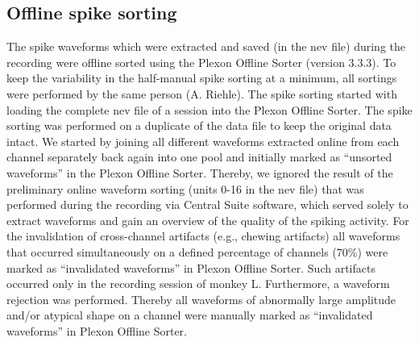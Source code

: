 {\subsection{Offline spike sorting}
\label{sec:offline_spike_sorting}
The spike waveforms which were extracted and saved (in the nev file) during the recording were offline sorted using the Plexon Offline Sorter (version 3.3.3). To keep the variability in the half-manual spike sorting at a minimum, all sortings were performed by the same person (A. Riehle). The spike sorting started with loading the complete nev file of a session into the Plexon Offline Sorter. The spike sorting was performed on a duplicate of the data file to keep the original data intact. We started by joining all different waveforms extracted online from each channel separately back again into one pool and initially marked as “unsorted waveforms” in the Plexon Offline Sorter. Thereby, we ignored the result of the preliminary online waveform sorting (units 0-16 in the nev file) that was performed during the recording via Central Suite software, which served solely to extract waveforms and gain an overview of the quality of the spiking activity. For the invalidation of cross-channel artifacts (e.g., chewing artifacts) all waveforms that occurred simultaneously on a defined percentage of channels (70\%) were marked as “invalidated waveforms” in Plexon Offline Sorter. Such artifacts occurred only in the recording session of monkey L. Furthermore, a waveform rejection was performed. Thereby all waveforms of abnormally large amplitude and/or atypical shape on a channel were manually marked as “invalidated waveforms” in Plexon Offline Sorter.

}
